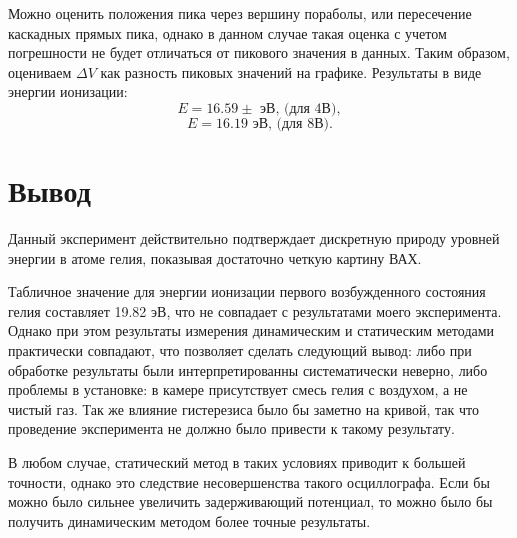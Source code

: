 \documentclass[a4paper, 14pt]{extarticle}%
\begin{document}
Можно оценить положения пика через вершину пораболы, или пересечение каскадных прямых пика, однако в данном случае такая оценка с учетом погрешности не будет отличаться от пикового значения в данных. Таким образом, оцениваем $\Delta V$ как разность пиковых значений на графике. 
\newpage
Результаты в виде энергии ионизации:
\[E = 16.59 \pm  \text{ эВ, (для 4В)},\] 
\[E = 16.19 \text{ эВ, (для 8В)}. \]

\section*{Вывод}

Данный эксперимент действительно подтверждает дискретную природу уровней энергии в атоме гелия, показывая достаточно четкую картину ВАХ. 

Табличное значение для энергии ионизации первого возбужденного состояния гелия составляет 19.82 эВ, что не совпадает с результатами моего эксперимента. Однако при этом результаты измерения динамическим и статическим методами практически совпадают, что позволяет сделать следующий вывод: либо при обработке результаты были интерпретированны систематически неверно, либо проблемы в установке: в камере присутствует смесь гелия с воздухом, а не чистый газ. Так же влияние гистерезиса было бы заметно на кривой, так что проведение эксперимента не должно было привести к такому результату.

В любом случае, статический метод в таких условиях приводит к большей точности, однако это следствие несовершенства такого осциллографа. Если бы можно было сильнее увеличить задерживающий потенциал, то можно было бы получить динамическим методом более точные результаты.
\end{document}
